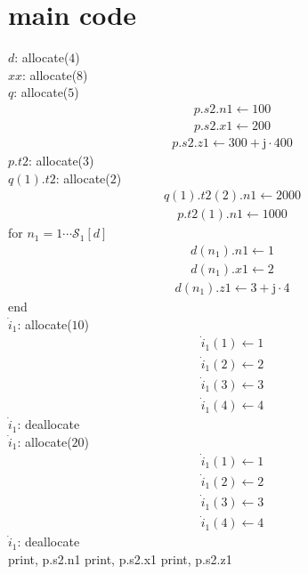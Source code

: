 \documentclass[a4paper,fleqn]{ltjsarticle}
\begin{document}
\section{main code}
$d$: allocate($4$)\\
$xx$: allocate($8$)\\
$q$: allocate($5$)\\
\begin{align}
p.s2.n1 \leftarrow 100
\end{align}
\begin{align}
p.s2.x1 \leftarrow 200
\end{align}
\begin{align}
p.s2.z1 \leftarrow 300+\mathrm{j} \cdot 400
\end{align}
$p.t2$: allocate($3$)\\
$q(1).t2$: allocate($2$)\\
\begin{align}
q(1).t2(2).n1 \leftarrow 2000
\end{align}
\begin{align}
p.t2(1).n1 \leftarrow 1000
\end{align}
for $n_{1}=1\cdots \mathcal{S}_1[d]$\\
  \begin{align}
  d(n_{1}).n1 \leftarrow 1
  \end{align}
  \begin{align}
  d(n_{1}).x1 \leftarrow 2
  \end{align}
  \begin{align}
  d(n_{1}).z1 \leftarrow 3+\mathrm{j} \cdot 4
  \end{align}
end\\
$\dot{i}_{1}$: allocate($10$)\\
\begin{align}
\dot{i}_{1}(1) \leftarrow 1
\end{align}
\begin{align}
\dot{i}_{1}(2) \leftarrow 2
\end{align}
\begin{align}
\dot{i}_{1}(3) \leftarrow 3
\end{align}
\begin{align}
\dot{i}_{1}(4) \leftarrow 4
\end{align}
$\dot{i}_{1}$: deallocate\\
$\dot{i}_{1}$: allocate($20$)\\
\begin{align}
\dot{i}_{1}(1) \leftarrow 1
\end{align}
\begin{align}
\dot{i}_{1}(2) \leftarrow 2
\end{align}
\begin{align}
\dot{i}_{1}(3) \leftarrow 3
\end{align}
\begin{align}
\dot{i}_{1}(4) \leftarrow 4
\end{align}
$\dot{i}_{1}$: deallocate\\
print, p.s2.n1
print, p.s2.x1
print, p.s2.z1
\end{document}
